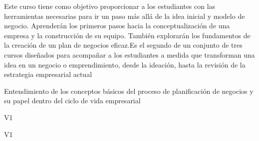 \begin{syllabus}


\begin{justification}
Este curso tiene como objetivo proporcionar a los estudiantes con las herramientas necesarias para ir un paso más allá de la idea inicial y modelo de negocio. Aprenderán los primeros pasos hacia la conceptualización de una empresa y la construcción de su equipo. También explorarán los fundamentos de la creación de un plan de negocios
eficaz.Es el segundo de un conjunto de tres cursos diseñados para acompañar a los estudiantes a medida que transforman una idea en un negocio o emprendimiento, desde la ideación, hasta la revisión de la estrategia empresarial actual
\end{justification}

\begin{goals}
\item Entendimiento de  los conceptos básicos del proceso de planificación de negocios y su papel dentro del ciclo de vida empresarial
\end{goals}

\begin{outcomes}{V1}
   \item {}
   \item {}
   \item {}
\end{outcomes}

\begin{competences}{V1}
    \item {}
    \item {}
    \item {}
\end{competences}


\end{syllabus}
